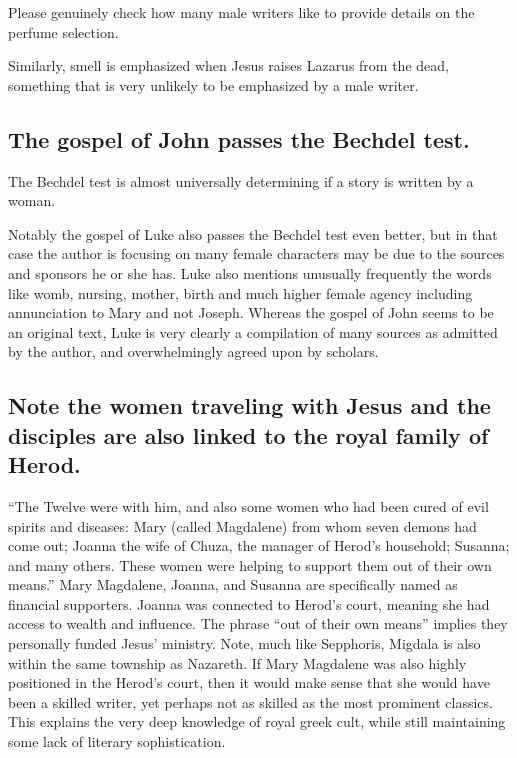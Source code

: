 Please genuinely check how many male writers like to provide details on the perfume selection.

Similarly, smell is emphasized when Jesus raises Lazarus from the dead, something that is very unlikely to be emphasized by a male writer.

\subsection{The gospel of John passes the Bechdel test.}\label{subsec:the-gospel-of-john-passes-the-bechdel-test.}

The Bechdel test is almost universally determining if a story is written by a woman.

Notably the gospel of Luke also passes the Bechdel test even better, but in that case the author is focusing on many female characters may be due to the sources and sponsors he or she has.
Luke also mentions unusually frequently the words like womb, nursing, mother, birth and much higher female agency including annunciation to Mary and not Joseph.
Whereas the gospel of John seems to be an original text, Luke is very clearly a compilation of many sources as admitted by the author, and overwhelmingly agreed upon by scholars.

\subsection{Note the women traveling with Jesus and the disciples are also linked to the royal family of Herod.}\label{subsec:note-the-women-traveling-with-jesus-and-the-disciples-are-also-linked-to-the-royal-family-of-herod.}

``The Twelve were with him, and also some women who had been cured of evil spirits and diseases: Mary (called Magdalene) from whom seven demons had come out; Joanna the wife of Chuza, the manager of Herod's household; Susanna; and many others.
These women were helping to support them out of their own means.'' Mary Magdalene, Joanna, and Susanna are specifically named as financial supporters.
Joanna was connected to Herod's court, meaning she had access to wealth and influence.
The phrase ``out of their own means'' implies they personally funded Jesus' ministry.
Note, much like Sepphoris, Migdala is also within the same township as Nazareth.
If Mary Magdalene was also highly positioned in the Herod's court, then it would make sense that she would have been a skilled writer, yet perhaps not as skilled as the most prominent classics.
This explains the very deep knowledge of royal greek cult, while still maintaining some lack of literary sophistication.

